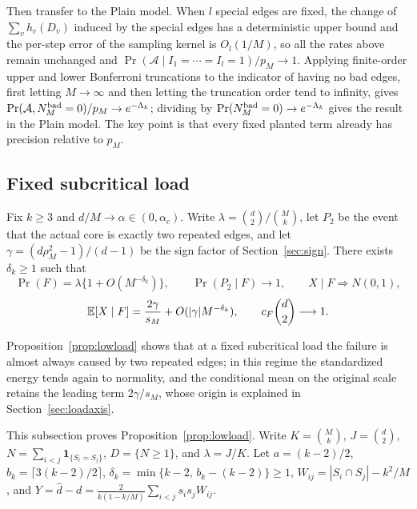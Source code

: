 Then transfer to the Plain model. When $l$ special edges are fixed, the change of
$\sum_vh_c(D_v)$ induced by the special edges has a deterministic upper bound and the per-step
error of the sampling kernel is $O_l(1/M)$, so all the rates above remain unchanged and
$\Pr(\mathcal A\mid I_1=\cdots=I_l=1)/p_M\to1$. Applying finite-order upper and lower Bonferroni
truncations to the indicator of having no bad edges, first letting $M\to\infty$ and then letting
the truncation order tend to infinity, gives $\Pr(\mathcal A,N^{\rm bad}_M=0)/p_M\to
e^{-\Lambda_k}$; dividing by $\Pr(N^{\rm bad}_M=0)\to e^{-\Lambda_k}$ gives the result in the
Plain model. The key point is that every fixed planted term already has precision relative to
$p_M$.
\subsection{Fixed subcritical load}\label{app:lowload}
\begin{proposition}\label{prop:lowload}
Fix $k\ge3$ and $d/M\to\alpha\in(0,\alpha_c)$. Write $\lambda=\binom d2/\binom Mk$, let $P_2$ be
the event that the actual core is exactly two repeated edges, and let
$\gamma=(d\rho_M^2-1)/(d-1)$ be the sign factor of Section~\ref{sec:sign}. There exists
$\delta_k\ge1$ such that
\begin{equation*}
\Pr(F)=\lambda\{1+O(M^{-\delta_k})\},\qquad \Pr(P_2\mid F)\to1,\qquad X\mid F\Rightarrow N(0,1),
\end{equation*}
\begin{equation*}
\mathbb E[X\mid F]=\frac{2\gamma}{s_M}+O(|\gamma|M^{-\delta_k}),\qquad c_F\binom d2\longrightarrow1.
\end{equation*}
\end{proposition}
Proposition~\ref{prop:lowload} shows that at a fixed subcritical load the failure is almost always
caused by two repeated edges; in this regime the standardized energy tends again to normality, and
the conditional mean on the original scale retains the leading term $2\gamma/s_M$, whose origin is
explained in Section~\ref{sec:loadaxis}.

This subsection proves Proposition~\ref{prop:lowload}. Write $K=\binom Mk$, $J=\binom d2$,
$N=\sum_{i<j}\mathbf1_{\{S_i=S_j\}}$, $D=\{N\ge1\}$, and $\lambda=J/K$. Let $a=(k-2)/2$,
$b_k=\lceil3(k-2)/2\rceil$, $\delta_k=\min\{k-2,\,b_k-(k-2)\}\ge1$,
$W_{ij}=|S_i\cap S_j|-k^2/M$, and
$Y=\widehat d-d=\frac{2}{k(1-k/M)}\sum_{i<j}s_is_jW_{ij}$.

